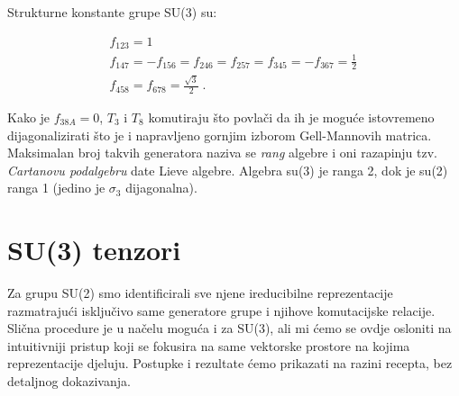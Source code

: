 Strukturne konstante grupe SU(3) su:

\begin{gather}
f_{123} = 1 \, \nonumber \\
f_{147} = -f_{156} = f_{246} = f_{257} = f_{345} = -f_{367} = \frac{1}{2} \, \\
f_{458} = f_{678} = \frac{\sqrt{3}}{2} \;. \nonumber
\end{gather}

Kako je $f_{38A}=0$, $T_3$ i $T_8$ komutiraju što povlači da ih je moguće
istovremeno dijagonalizirati što je i napravljeno gornjim izborom
Gell-Mannovih matrica.
Maksimalan broj takvih generatora naziva se \emph{rang} algebre i oni razapinju
tzv. \emph{Cartanovu podalgebru} date Lieve algebre. 
Algebra su(3) je ranga 2, dok je su(2) ranga 1 (jedino je $\sigma_3$ dijagonalna).

\section{SU(3) tenzori}

Za grupu SU(2) smo identificirali sve njene ireducibilne reprezentacije
razmatrajući isključivo same generatore grupe i njihove komutacijske relacije.
Slična procedure je u načelu moguća i za SU(3), ali mi ćemo se ovdje osloniti
na intuitivniji pristup koji se fokusira na same vektorske prostore na kojima
reprezentacije djeluju. Postupke i rezultate ćemo prikazati na razini
recepta, bez detaljnog dokazivanja.


